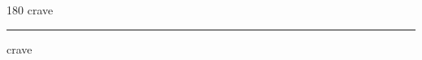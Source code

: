 
\begin{frame}
\begin{center}
\begin{turn}{180}
{\fontsize{2.5cm}{1em}\selectfont crave}
\end{turn}
\vspace{1em}\par  
\hrule
\vspace{1em}\par  
{\fontsize{2.5cm}{1em}\selectfont crave}
\end{center}
\end{frame}
